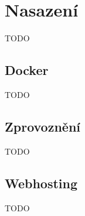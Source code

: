 \chapter{Nasazení}
TODO

\section{Docker}
TODO

\section{Zprovoznění}
TODO

\section{Webhosting}
TODO
